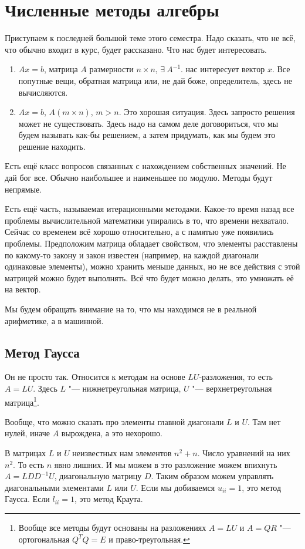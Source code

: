 \section{Численные методы алгебры}
Приступаем к последней большой теме этого семестра. Надо сказать, что не всё, что обычно входит в курс, будет рассказано. Что нас будет интересовать.
\begin{enumerate}
\item $Ax = b$, матрица $A$ размерности $n\times n$, $\exists\ A^{-1}$. нас интересует вектор $x$. Все попутные вещи, обратная матрица или, не дай боже, определитель, здесь не вычисляются.
\item $Ax = b$, $A (m\times n)$, $m>n$. Это хорошая ситуация. Здесь запросто решения может не существовать. Здесь надо на самом деле договориться, что мы будем называть как-бы решением, а затем придумать, как мы будем это решение находить.
\end{enumerate}
Есть ещё класс вопросов связанных с нахождением собственных значений. Не дай бог все. Обычно наибольшее и наименьшее по модулю. Методы будут непрямые.

Есть ещё часть, называемая итерационными методами. Какое-то время назад все проблемы вычислительной математики упирались в то, что времени нехватало. Сейчас со временем всё хорошо относительно, а с памятью уже появились проблемы. Предположим матрица обладает свойством, что элементы расставлены по какому-то закону и закон известен (например, на каждой диагонали одинаковые элементы), можно хранить меньше данных, но не все действия с этой матрицей можно будет выполнять. Всё что будет можно делать, это умножать её на вектор.

Мы будем обращать внимание на то, что мы находимся не в реальной арифметике, а в машинной.

\subsection{Метод Гаусса}
Он не просто так. Относится к методам на основе $LU$-разложения, то есть $A = LU$. Здесь $L$ "--- нижнетреугольная матрица, $U$ "--- верхнетреугольная матрица\footnote{Вообще все методы будут основаны на разложениях $A=LU$ и $A = QR$ "--- ортогональная $Q^TQ = E$ и право-треугольная.}.

Вообще, что можно сказать про элементы главной диагонали $L$ и $U$. Там нет нулей, иначе $A$ вырождена, а это нехорошо.

В матрицах $L$ и $U$ неизвестных нам элементов $n^2+n$. Число уравнений на них $n^2$. То есть $n$ явно лишних. И мы можем в это разложение можем впихнуть $A = L D D^{-1} U$, диагональную матрицу $D$. Таким образом можем управлять диагональными элементами $L$ или $U$. Если мы добиваемся $u_{ii}=1$, это метод Гаусса. Если $l_{ii} = 1$, это метод Краута.

